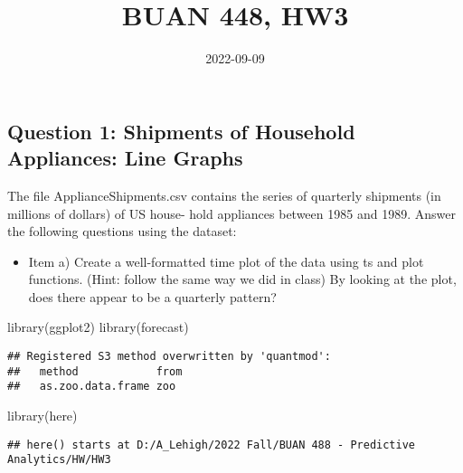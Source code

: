 \documentclass[
]{article}
\title{BUAN 448, HW3}
\author{}
\date{\vspace{-2.5em}2022-09-09}
\newenvironment{Shaded}{\begin{snugshade}}{\end{snugshade}}
\newcommand{\FunctionTok}[1]{\textcolor[rgb]{0.00,0.00,0.00}{#1}}
\newcommand{\NormalTok}[1]{#1}
\providecommand{\tightlist}{%
  \setlength{\itemsep}{0pt}\setlength{\parskip}{0pt}}
\begin{document}
\maketitle

\hypertarget{question-1-shipments-of-household-appliances-line-graphs}{%
\subsection{Question 1: Shipments of Household Appliances: Line
Graphs}\label{question-1-shipments-of-household-appliances-line-graphs}}

The file ApplianceShipments.csv contains the series of quarterly
shipments (in millions of dollars) of US house- hold appliances between
1985 and 1989. Answer the following questions using the dataset:

\begin{itemize}
\tightlist
\item
  Item a) Create a well-formatted time plot of the data using ts and
  plot functions. (Hint: follow the same way we did in class) By looking
  at the plot, does there appear to be a quarterly pattern?
\end{itemize}

\begin{Shaded}
\begin{Highlighting}[]
\FunctionTok{library}\NormalTok{(ggplot2)}
\FunctionTok{library}\NormalTok{(forecast)}
\end{Highlighting}
\end{Shaded}

\begin{verbatim}
## Registered S3 method overwritten by 'quantmod':
##   method            from
##   as.zoo.data.frame zoo
\end{verbatim}

\begin{Shaded}
\begin{Highlighting}[]
\FunctionTok{library}\NormalTok{(here)}
\end{Highlighting}
\end{Shaded}

\begin{verbatim}
## here() starts at D:/A_Lehigh/2022 Fall/BUAN 488 - Predictive Analytics/HW/HW3
\end{verbatim}
\end{document}
